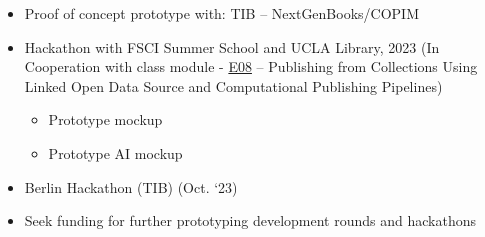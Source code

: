 \documentclass{article}
\begin{document}
\begin{itemize}
\item Proof of concept prototype with: TIB – NextGenBooks/COPIM


\item Hackathon with FSCI Summer School and UCLA Library, 2023 (In Cooperation with class module - \href{https://force11.org/fsci/post/course-list-with-abstracts-2023/#e08}{E08} – Publishing from Collections Using Linked Open Data Source and Computational Publishing Pipelines) 

\begin{itemize}
\item Prototype mockup


\item Prototype AI mockup


\end{itemize}

\item Berlin Hackathon (TIB) (Oct. ‘23) 


\item Seek funding for further prototyping development rounds and hackathons 


\end{itemize}
\end{document}
